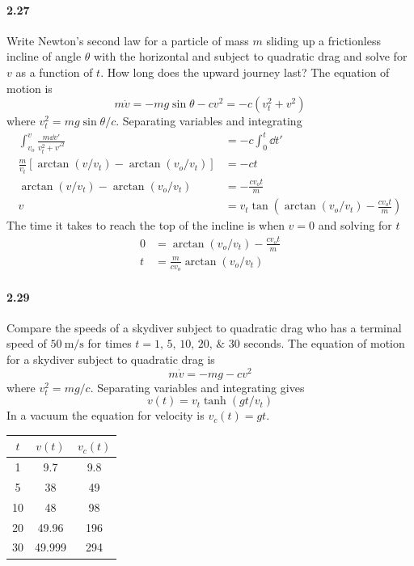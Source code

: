 \documentclass[../problems.tex]{subfiles}
\begin{document}
\paragraph{2.27} Write Newton's second law for a particle of mass $m$ sliding up a frictionless
incline of angle $\theta$ with the horizontal and subject to quadratic drag and solve for $v$ as a
function of $t$. How long does the upward journey last?
\barh
The equation of motion is
\begin{equation*}
    m \dot{v} = -mg \sin \theta - c v^2 = -c (v_t^2 + v^2)
\end{equation*}
where $v_t^2 = mg\sin\theta/c$. Separating variables and integrating
\begin{align*}
    \int_{v_o}^v \frac{m \dd{v'}}{v_t^2 + v'^2} &= -c \int_0^t \dd{t'} \\
    \frac{m}{v_t} [\arctan(v/v_t) - \arctan(v_o/v_t)]&= -ct \\
    \arctan(v/v_t) - \arctan(v_o/v_t) &= -\frac{cv_ot}{m} \\
    v &= v_t \tan(\arctan(v_o/v_t) - \frac{cv_ot}{m})
\end{align*}
The time it takes to reach the top of the incline is when $v = 0$ and solving for $t$
\begin{align*}
    0 &= \arctan(v_o/v_t) - \frac{cv_ot}{m} \\
    t &= \frac{m}{cv_o} \arctan(v_o/v_t)
\end{align*}

\paragraph{2.29} Compare the speeds of a skydiver subject to quadratic drag who has a terminal speed
of $\qty{50}{\m/\s}$ for times $t = \numlist{1;5;10;20;30}$ seconds.
\barh 
The equation of motion for a skydiver subject to quadratic drag is
\begin{equation*}
    m \dot{v} = -mg - cv^2
\end{equation*}
where $v_t^2 = mg/c$. Separating variables and integrating gives 
\begin{equation*} \tag{2.57}
    v(t) = v_t \tanh(gt/v_t)
\end{equation*}
In a vacuum the equation for velocity is $v_c(t) = gt$.

\begin{center}
    \begin{tabular}{c c c}
        $t$ & $v(t)$ & $v_c(t)$ \\
        \hline
        1 & 9.7 & 9.8 \\
        5 & 38 & 49 \\
        10 & 48 & 98 \\
        20 & 49.96 & 196 \\
        30 & 49.999 & 294
    \end{tabular}
\end{center}
\end{document}
